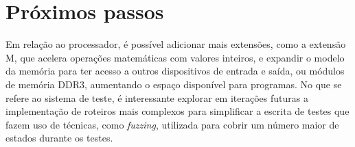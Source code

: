 \section{Próximos passos}
\label{sec:aaaaaaaaa}

Em relação ao processador, é possível adicionar mais extensões,
como a extensão M, que acelera operações matemáticas com valores inteiros, e
expandir o modelo da memória para ter acesso a outros dispositivos de entrada e saída,
ou módulos de memória DDR3, aumentando o espaço disponível para programas.
No que se refere ao sistema de teste, é interessante explorar em iterações futuras
a implementação de roteiros mais complexos para simplificar a escrita
de testes que fazem uso de técnicas, como \emph{fuzzing}, utilizada para 
cobrir um número maior de estados durante os testes.
